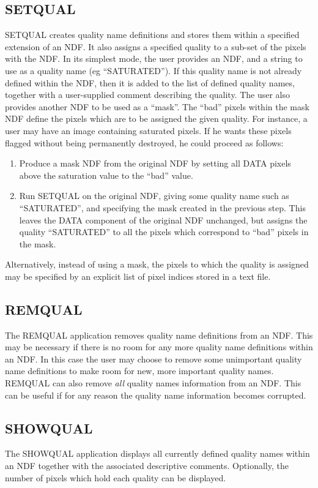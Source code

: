 \subsection{SETQUAL}
SETQUAL creates quality name definitions and stores them within a specified
extension of an NDF. It also assigns a specified quality to a sub-set of the
pixels with the NDF. In its simplest mode, the user provides an NDF, and a
string to use as a quality name (eg ``SATURATED''). If this quality name is not
already defined within the NDF, then it is added to the list of defined quality
names, together with a user-supplied comment describing the quality. The user
also provides another NDF to be used as a ``mask''. The ``bad'' pixels within
the mask NDF define the pixels which are to be assigned the given quality. For
instance, a user may have an image containing saturated pixels. If he wants
these pixels flagged without being permanently destroyed, he could proceed as
follows:
\begin{enumerate}
\item Produce a mask NDF from the original NDF by setting all DATA pixels
above the saturation value to the ``bad'' value.
\item Run SETQUAL on the original NDF, giving some quality name such as
``SATURATED'', and specifying the mask created in the previous step. This leaves
the DATA component of the original NDF unchanged, but assigns the quality
``SATURATED'' to all the pixels which correspond to ``bad'' pixels in the mask.
\end{enumerate}
Alternatively, instead of using a mask, the pixels to which the quality is
assigned may be specified by an explicit list of pixel indices stored in a
text file.

\subsection{REMQUAL}
The REMQUAL application removes quality name definitions from an NDF. This may be
necessary if there is no room for any more quality name definitions within an
NDF. In this case the user may choose to remove some unimportant quality name
definitions to make room for new, more important quality names. REMQUAL can also
remove {\em all} quality names information from an NDF. This can be useful if
for any reason the quality name information becomes corrupted.

\subsection{SHOWQUAL}
The SHOWQUAL application displays all currently defined quality names within an
NDF together with the associated descriptive comments. Optionally, the number of
pixels which hold each quality can be displayed.

